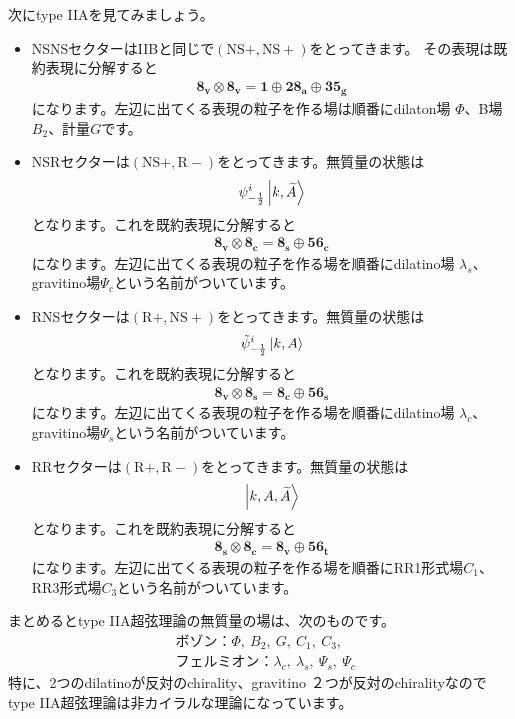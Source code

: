 \documentclass[report,paper=a4, fontsize=12pt, line_length=16cm, number_of_lines=33,dvipdfmx]{jlreq}
\numberwithin{equation}{chapter}
\numberwithin{equation}{section}
\newcommand{\At}{\widetilde{A}}
\newcommand{\psit}{\tilde{\psi}}
\newcommand{\NSp}{\mathrm{NS}+}
\newcommand{\Rp}{\mathrm{R}+}
\newcommand{\Rm}{\mathrm{R}-}
\newcommand{\triv}{\mathbf{1}}
\newcommand{\etv}{\mathbf{8_v}}
\newcommand{\ets}{\mathbf{8_s}}
\newcommand{\etc}{\mathbf{8_c}}
\newcommand{\tweta}{\mathbf{28_{a}}}
\newcommand{\thfvg}{\mathbf{35_{g}}}
\newcommand{\fsxt}{\mathbf{56_t}}
\newcommand{\fsxs}{\mathbf{56_s}}
\newcommand{\fsxc}{\mathbf{56_c}}
\begin{document}
次にtype IIAを見てみましょう。
\begin{itemize}
  \item NSNSセクターはIIBと同じで$(\NSp,\NSp)$をとってきます。
  その表現は既約表現に分解すると
  \begin{align}
    \etv\otimes\etv= \triv \oplus \tweta\oplus \thfvg
  \end{align}
  になります。左辺に出てくる表現の粒子を作る場は順番にdilaton場 $\Phi$、B場$B_2$、計量$G$です。
  \item NSRセクターは$(\NSp,\Rm)$をとってきます。無質量の状態は
  \begin{align}
    \psi_{-\frac12}^{i}\ket{k,\At}
  \end{align}
  となります。これを既約表現に分解すると
  \begin{align}
    \etv\otimes\etc= \ets \oplus \fsxc
  \end{align}
  になります。左辺に出てくる表現の粒子を作る場を順番にdilatino場 $\lambda_{s}$、gravitino場$\Psi_{c}$という名前がついています。
  \item RNSセクターは$(\Rp,\NSp)$をとってきます。無質量の状態は
  \begin{align}
    \psit_{-\frac12}^{i}\ket{k,A}
  \end{align}
  となります。これを既約表現に分解すると
  \begin{align}
    \etv\otimes\ets= \etc \oplus \fsxs
  \end{align}
  になります。左辺に出てくる表現の粒子を作る場を順番にdilatino場 $\lambda_{c}$、gravitino場$\Psi_{s}$という名前がついています。
  \item RRセクターは$(\Rp,\Rm)$をとってきます。無質量の状態は
  \begin{align}
    \ket{k,A,\At}
  \end{align}
  となります。これを既約表現に分解すると
  \begin{align}
    \ets\otimes\etc= \etv\oplus\fsxt
  \end{align}
  になります。左辺に出てくる表現の粒子を作る場を順番にRR1形式場$C_1$、RR3形式場$C_3$という名前がついています。
\end{itemize}
まとめるとtype IIA超弦理論の無質量の場は、次のものです。
\begin{align}
  &\text{ボゾン：}\Phi,\ B_2,\ G,\ C_1,\ C_3,\\
  &\text{フェルミオン：} \lambda_{c},\ \lambda_{s},\ \Psi_{s},\ \Psi_{c}
\end{align}
特に、2つのdilatinoが反対のchirality、gravitino ２つが反対のchiralityなのでtype IIA超弦理論は非カイラルな理論になっています。
\end{document}
